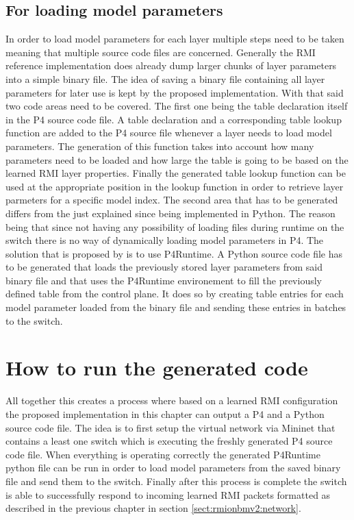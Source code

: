 \subsection{For loading model parameters}
\label{sect:rmiforp4:parameters}
In order to load model parameters for each layer multiple steps need to be taken meaning that multiple source code files are concerned. Generally the RMI reference implementation does already dump larger chunks of layer parameters into a simple binary file. The idea of saving a binary file containing all layer parameters for later use is kept by the proposed implementation. With that said two code areas need to be covered. The first one being the table declaration itself in the P4 source code file. A table declaration and a corresponding table lookup function are added to the P4 source file whenever a layer needs to load model parameters. The generation of this function takes into account how many parameters need to be loaded and how large the table is going to be based on the learned RMI layer properties. Finally the generated table lookup function can be used at the appropriate position in the lookup function in order to retrieve layer parmeters for a specific model index. The second area that has to be generated differs from the just explained since being implemented in Python. The reason being that since not having any possibility of loading files during runtime on the switch there is no way of dynamically loading model parameters in P4. The solution that is proposed by \cite{p4runtime-spec} is to use P4Runtime. A Python source code file has to be generated that loads the previously stored layer parameters from said binary file and that uses the P4Runtime environement to fill the previously defined table from the control plane. It does so by creating table entries for each model parameter loaded from the binary file and sending these entries in batches to the switch.

\section{How to run the generated code}
All together this creates a process where based on a learned RMI configuration the proposed implementation in this chapter can output a P4 and a Python source code file. The idea is to first setup the virtual network via Mininet that contains a least one switch which is executing the freshly generated P4 source code file. When everything is operating correctly the generated P4Runtime python file can be run in order to load model parameters from the saved binary file and send them to the switch. Finally after this process is complete the switch is able to successfully respond to incoming learned RMI packets formatted as described in the previous chapter in section \ref{sect:rmionbmv2:network}.

